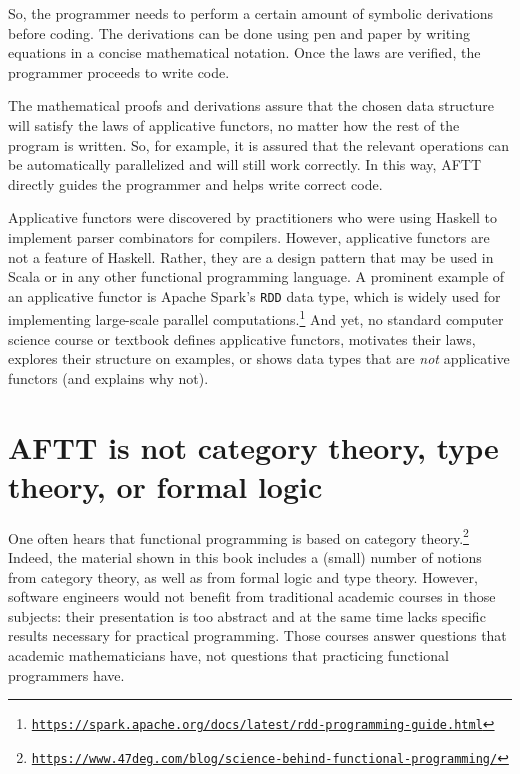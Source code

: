 So, the programmer needs to perform a certain amount of symbolic derivations
before coding. The derivations can be done using pen and paper by
writing equations in a concise mathematical notation. Once the laws
are verified, the programmer proceeds to write code.

The mathematical proofs and derivations assure that the chosen data
structure will satisfy the laws of applicative functors, no matter
how the rest of the program is written. So, for example, it is assured
that the relevant operations can be automatically parallelized and
will still work correctly. In this way, AFTT directly guides the programmer
and helps write correct code.

Applicative functors were discovered by practitioners who were using
Haskell to implement parser combinators for compilers. However, applicative
functors are not a feature of Haskell. Rather, they are a design pattern
that may be used in Scala or in any other functional programming language.
A prominent example of an applicative functor is Apache Spark\textsf{'}s \lstinline!RDD!
data type, which is widely used for implementing large-scale parallel
computations.\footnote{\texttt{\href{https://spark.apache.org/docs/latest/rdd-programming-guide.html}{https://spark.apache.org/docs/latest/rdd-programming-guide.html}}}
And yet, no standard computer science course or textbook defines applicative
functors, motivates their laws, explores their structure on examples,
or shows data types that are \emph{not} applicative functors (and
explains why not). 

\section{AFTT is not category theory, type theory, or formal logic}

One often hears that functional programming is based on category theory.\footnote{\texttt{\href{https://www.47deg.com/blog/science-behind-functional-programming/}{https://www.47deg.com/blog/science-behind-functional-programming/}}}
Indeed, the material shown in this book includes a (small) number
of notions from category theory, as well as from formal logic and
type theory. However, software engineers would not benefit from traditional
academic courses in those subjects: their presentation is too abstract
and at the same time lacks specific results necessary for practical
programming. Those courses answer questions that academic mathematicians
have, not questions that practicing functional programmers have.

